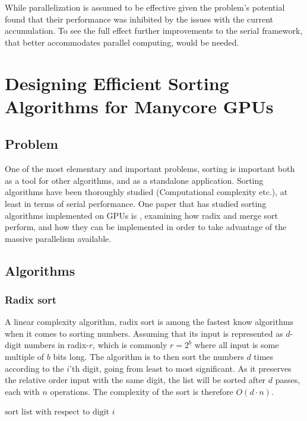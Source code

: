 \documentclass[twocolumn]{article} %
\begin{document}
		While parallelization is assumed to be effective given the problem's potential \cite{bird13} found that their
		performance was inhibited by the issues with the current accumulation. To see the full effect further
		improvements to the serial framework, that better accommodates parallel computing, would be needed.

\section*{Designing Efficient Sorting Algorithms for Manycore GPUs}
	\subsection*{Problem}
	One of the most elementary and important problems, sorting is important both as a tool for other algorithms,
	and as a standalone application. Sorting algorithms have been thoroughly studied (Computational complexity etc.),
	at least in terms of serial performance. One paper that has studied sorting algorithms implemented on GPUs is \cite{satish09},
	examining how radix and merge sort perform, and how they can be implemented in order to take advantage of
	the massive parallelism available.
	
	\subsection*{Algorithms}
		\subsubsection*{Radix sort}
			A linear complexity algorithm, radix sort is among the fastest know algorithms when it comes to sorting numbers.
			Assuming that its input is represented as $d$-digit numbers in radix-$r$, which is commonly $r=2^b$ where all input
			is some multiple of $b$ bits long. The algorithm is to then sort the numbers $d$ times according to the $i$'th digit,
			going from least to most significant. As it preserves the relative order input with the same digit, the list will be
			sorted after $d$ passes, each with $n$ operations. The complexity of the sort is therefore $O(d \cdot n)$.
			\begin{algorithmic}
					\State $\text{sort list with respect to digit }i$\\
				\EndFor
			\end{algorithmic}		
			
\end{document}
